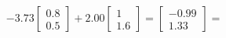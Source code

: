 \documentclass[preview]{standalone}
\begin{document}
\begin{align*}
-3.73 \begin{bmatrix} 0.8 \\ 0.5 \end{bmatrix} + 2.00 \begin{bmatrix} 1 \\ 1.6 \end{bmatrix} = \begin{bmatrix} -0.99 \\ 1.33 \end{bmatrix} =
\end{align*}
\end{document}

